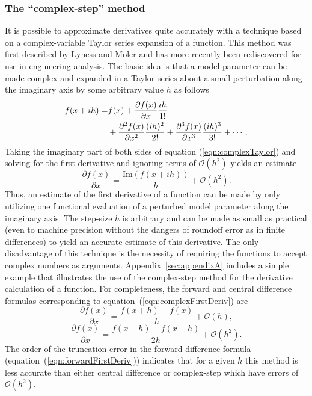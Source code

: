 \documentclass[preprint,12pt]{elsarticle}
\begin{document}
\subsubsection{The ``complex-step'' method}  
\label{sec:CSmethod} 

It is possible to approximate derivatives quite accurately with a technique based on a complex-variable Taylor series expansion of a function.  This method was first described by Lyness and Moler \cite{lyness1967numerical,lyness1968differentiation} and has more recently been rediscovered for use in engineering analysis.  The basic idea is that a model parameter can be made complex and expanded in a Taylor series about a small perturbation along the imaginary axis by some arbitrary value $h$ as follows
%
\begin{align} 
    f ( x + i h ) =& f(x) + \frac{\partial f(x)}{\partial x} \frac{i h}{1!}  \notag \\ &+ \frac{\partial^2 f(x)}{\partial x^2} \frac{(i h)^2}{2!} + \frac{\partial^3 f(x)}{\partial x^3} \frac{(i h)^3}{3!} + \cdots.
\label{eqn:complexTaylor} 
\end{align}
%
Taking the imaginary part of both sides of equation (\ref{eqn:complexTaylor}) and solving for the first derivative and ignoring terms of $\mathcal{O}(h^2)$ yields an estimate
%
\begin{equation} \frac{\partial f( x )}{\partial x} = \frac{\mbox{Im} \left( f (x + i h) \right)}{h} +\mathcal{O}\left( h^2 \right).  
\label{eqn:complexFirstDeriv} 
\end{equation}
%
Thus, an estimate of the first derivative of a function can be made by only utilizing one functional evaluation of a perturbed model parameter along the imaginary axis.  The step-size $h$ is arbitrary and can be made as small as practical (even to machine precision without the dangers of roundoff error as in finite differences) to yield an accurate estimate of this derivative.  The only disadvantage of this technique is the necessity of requiring the functions to accept complex numbers as arguments. Appendix~\ref{sec:appendixA} includes a simple example that illustrates the use of the complex-step method for the derivative calculation of a function. 
%
For completeness, the forward and central difference formulas corresponding to equation~(\ref{eqn:complexFirstDeriv}) are \cite[Chap. 4.1.3]{chapra2010}
%
\begin{equation} 
\frac{\partial f( x )}{\partial x} = \frac{f (x + h) - f (x)}{h} +\mathcal{O}\left( h \right), 
\label{eqn:forwardFirstDeriv} 
\end{equation}
%
\begin{equation} 
\frac{\partial f( x )}{\partial x} = \frac{f (x + h) - f (x - h)}{2h} +\mathcal{O}\left( h^2 \right). 
\label{eqn:centeredFirstDeriv} 
\end{equation} 
%
The order of the truncation error in the forward difference formula (equation~(\ref{eqn:forwardFirstDeriv})) indicates that for a given $h$ this method is less accurate than either central difference or complex-step which have errors of $\mathcal{O}(h^2)$.
\end{document}
